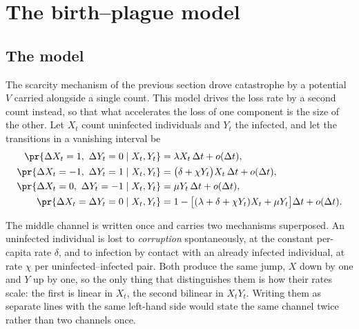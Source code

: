
\section{The birth--plague model}
\label{var:sec:plague}

\subsection{The model}
\label{var:sec:plaguemodel}

The scarcity mechanism of the previous section drove catastrophe by a
potential $V$ carried alongside a single count. This model drives the loss
rate by a second count instead, so that what accelerates
the loss of one component is the size of the other. Let $X_t$ count
uninfected individuals and $Y_t$ the infected, and let the transitions in a
vanishing interval be
\begin{align}
\pr{\Delta X_t=1,\ \Delta Y_t=0\mid X_t,Y_t}
  &=\lambda X_t\,\Delta t+o(\Delta t),
  \label{var:eq:plague}\\
\pr{\Delta X_t=-1,\ \Delta Y_t=1\mid X_t,Y_t}
  &=\bigl(\delta+\chi Y_t\bigr)X_t\,\Delta t+o(\Delta t),\notag\\
\pr{\Delta X_t=0,\ \Delta Y_t=-1\mid X_t,Y_t}
  &=\mu Y_t\,\Delta t+o(\Delta t),\notag\\
\pr{\Delta X_t=\Delta Y_t=0\mid X_t,Y_t}
  &=1-\bigl[(\lambda+\delta+\chi Y_t)X_t+\mu Y_t\bigr]\Delta t+o(\Delta t).
  \notag
\end{align}

The middle channel is written once and carries two mechanisms superposed. An
uninfected individual is lost to \emph{corruption} spontaneously, at the
constant per-capita rate $\delta$, and to infection by contact with an
already infected individual, at rate $\chi$ per uninfected--infected pair.
Both produce the same jump, $X$ down by one and $Y$ up by one, so the only
thing that distinguishes them is how their rates scale: the first is linear
in $X_t$, the second bilinear in $X_t Y_t$. Writing them as separate lines
with the same left-hand side would state the same channel twice rather than
two channels once.

